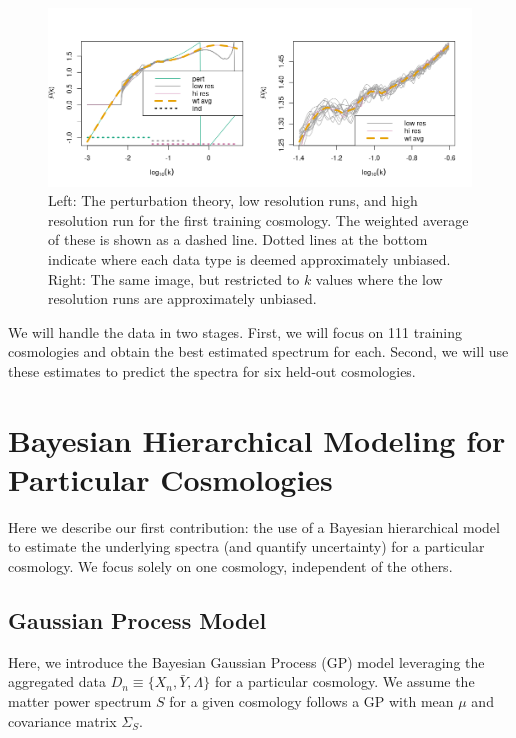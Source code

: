 \documentclass[11pt]{article}
\begin{document}
\begin{figure}[ht]
    \centering
    \includegraphics[width=6in]{plot_data.png}
    \caption{Left: The perturbation theory, low resolution runs, and high resolution run for the first training cosmology. The weighted average of these is shown as a dashed line. Dotted lines at the bottom indicate where each data type is deemed approximately unbiased. Right: The same image, but restricted to $k$ values where the low resolution runs are approximately unbiased.}
    \label{fig:plot_data}
\end{figure}

We will handle the data in two stages.  First, we will focus on 111 training cosmologies and obtain the best estimated spectrum for each.  Second, we will use these estimates to predict the spectra for six held-out cosmologies.

\section{Bayesian Hierarchical Modeling for Particular Cosmologies}
\label{sec:hm_fit}

Here we describe our first contribution: the use of a Bayesian hierarchical model to estimate the underlying spectra (and quantify uncertainty) for a particular cosmology.  We focus solely on one cosmology, independent of the others.

\subsection{Gaussian Process Model}

Here, we introduce the Bayesian Gaussian Process (GP) model leveraging the aggregated data $D_n \equiv \{X_n, \bar Y, \Lambda\}$ for a particular cosmology. We assume the matter power spectrum $S$ for a given cosmology follows a GP with mean $\mu$ and covariance matrix $\Sigma_S$.
\end{document}
